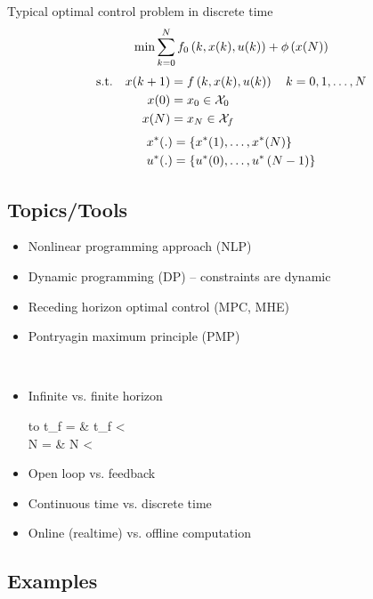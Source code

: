 \begin{problem}{Typical optimal control problem in discrete time}
    \begin{align}
    \min
     \sum_{k=0}^{N}
        f_0 \left( k, x(k), u(k) \right) + \phi \left( x(N) \right)
    \label{eq:optimisation-problem-disc}
    \end{align}
    \begin{align*}
    \st{} \quad
    x(k+1)    &= f \paren{k, x(k), u(k)}
            \quad k = 0, 1, \dots, N\\
    x(0)        &= x_0 \in \setX{0}\\
    x(N)        &= x_N \in \setX{f}
    \end{align*}
    \tcblower
    \begin{align*}
    x^*(.)    &= \left\lbrace x^*(1), \dots, x^*(N) \right\rbrace\\
    u^* (.)    &= \left\lbrace u^* (0), \dots, u^* \left( N-1 \right) \right\rbrace\\
    \end{align*}
\end{problem}

\subsection{Topics/Tools}
\begin{itemize}
\item Nonlinear programming approach (NLP)
\item Dynamic programming (DP) -- constraints are dynamic
\item Receding horizon optimal control (MPC, MHE)
\item Pontryagin maximum principle (PMP)
\end{itemize}~

\begin{itemize}
\item Infinite vs. finite horizon\\
        \begin{tabu} to 
        t_f = \infty    & t_f < \infty\\
        N = \infty        & N < \infty
        \end{tabu}
\item Open loop vs. feedback
\item Continuous time vs. discrete time
\item Online (realtime) vs. offline computation
\end{itemize}%

\subsection{Examples}
